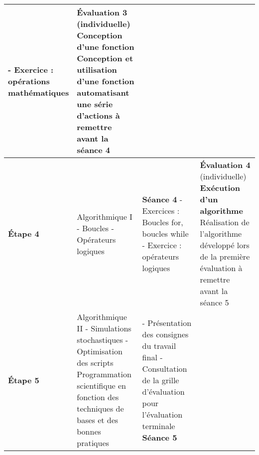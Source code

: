 \documentclass[12]{article}
\begin{document}
\begin{center}
\begin{tabular}{| p{0.1\linewidth} | p{0.3\linewidth} | p{0.3\linewidth} | p{0.3\linewidth} | }
        - Exercice : opérations mathématiques\hfill\hfill & 
        \textbf{Évaluation 3} (individuelle) \linebreak
        \textbf{Conception d'une fonction}\hfill\hfill \linebreak
        Conception et utilisation d'une fonction automatisant une série d'actions à remettre avant la séance 4\hfill\hfill \\
        \hline
        \textbf{Étape 4} \linebreak &
        Algorithmique I\hfill\hfill \linebreak\linebreak 
            - Boucles\hfill\hfill \linebreak
            - Opérateurs logiques\hfill\hfill &
        \textbf{Séance 4} \linebreak
        - Exercices : Boucles for, boucles while\hfill\hfill \linebreak
        - Exercice : opérateurs logiques\hfill\hfill & 
        \textbf{Évaluation 4} (individuelle) \linebreak
        \textbf{Exécution d'un algorithme}\hfill\hfill \linebreak
        Réalisation de l'algorithme développé lors de la première évaluation à remettre avant la séance 5\hfill\hfill \\
        \hline
        \textbf{Étape 5} \linebreak &
        Algorithmique II\hfill\hfill \linebreak\linebreak 
            - Simulations stochastiques\hfill\hfill \linebreak
            - Optimisation des scripts\hfill\hfill \linebreak\linebreak
        Programmation scientifique en fonction des techniques de bases et des bonnes pratiques &
        - Présentation des consignes du travail final \hfill\hfill \linebreak
        - Consultation de la grille d'évaluation pour l'évaluation terminale\hfill\hfill \linebreak
        \textbf{Séance 5} \linebreak

\end{tabular}
\end{center}
\end{document}
